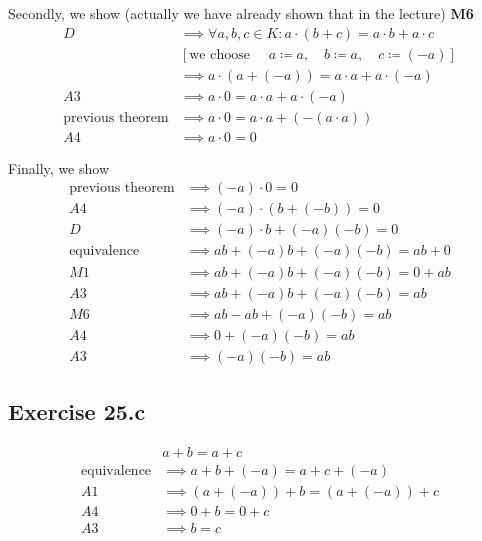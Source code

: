 \documentclass[a4paper]{article}
\theoremstyle{definition}
\begin{document}
Secondly, we show (actually we have already shown that in the lecture) \textbf{M6}
\begin{align*}
                        D &\implies \forall a,b,c \in K: a \cdot (b + c) = a \cdot b + a \cdot c \\
                          & [\text{we choose } \quad a \coloneqq a, \quad b \coloneqq a, \quad c \coloneqq (-a)] \\
                          &\implies a \cdot (a + (-a)) = a \cdot a + a \cdot (-a) \\
                       A3 &\implies a \cdot 0 = a \cdot a + a \cdot (-a) \\
  \text{previous theorem} &\implies a \cdot 0 = a \cdot a + (- (a \cdot a)) \\
                       A4 &\implies a \cdot 0 = 0
\end{align*}

Finally, we show
\begin{align*}
  \text{previous theorem} &\implies (-a) \cdot 0 = 0 \\
                       A4 &\implies (-a) \cdot (b + (-b)) = 0 \\
                        D &\implies (-a) \cdot b + (-a) (-b) = 0 \\
       \text{equivalence} &\implies ab + (-a) b + (-a) (-b) = ab + 0 \\
                       M1 &\implies ab + (-a) b + (-a) (-b) = 0 + ab \\
                       A3 &\implies ab + (-a) b + (-a) (-b) = ab \\
                       M6 &\implies ab - a b + (-a) (-b) = ab \\
                       A4 &\implies 0 + (-a) (-b) = ab \\
                       A3 &\implies (-a) (-b) = ab
\end{align*}

\subsection{Exercise 25.c}

\begin{align*}
                     & a + b = a + c \\
  \text{equivalence} &\implies a + b + (-a) = a + c + (-a) \\
                  A1 &\implies (a + (-a)) + b = (a + (-a)) + c \\
                  A4 &\implies 0 + b = 0 + c \\
                  A3 &\implies b = c
\end{align*}
\end{document}
